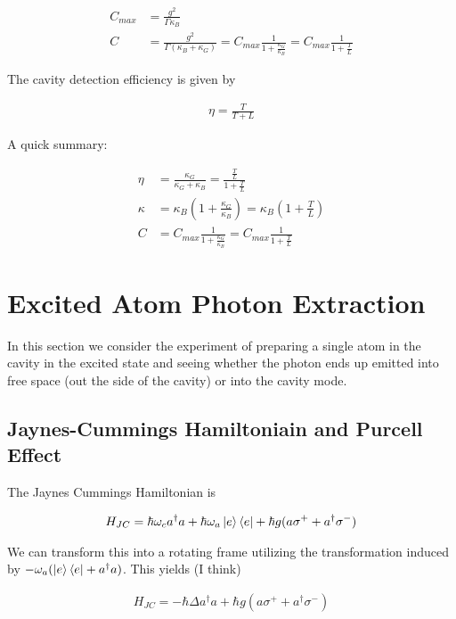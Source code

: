 \documentclass[12pt]{article}
\begin{document}
\begin{align}
C_{max} &= \frac{g^2}{\Gamma \kappa_B}\\
C &= \frac{g^2}{\Gamma(\kappa_B+\kappa_G)} = C_{max} \frac{1}{1+\frac{\kappa_G}{\kappa_B}} = C_{max} \frac{1}{1+\frac{T}{L}}
\end{align}

The cavity detection efficiency is given by

\begin{align}
\eta = \frac{T}{T+L}	
\end{align}

A quick summary:

\begin{align}
\eta &= \frac{\kappa_G}{\kappa_G+\kappa_B} = \frac{\frac{T}{L}}{1+\frac{T}{L}}\\
\kappa &= \kappa_B\left(1+\frac{\kappa_G}{\kappa_B}\right) = \kappa_B\left(1+\frac{T}{L}\right)\\
C &= C_{max}\frac{1}{1+\frac{\kappa_G}{\kappa_B}} = C_{max}\frac{1}{1+\frac{T}{L}}
\end{align}


\section{Excited Atom Photon Extraction}

In this section we consider the experiment of preparing a single atom in the cavity in the excited state and seeing whether the photon ends up emitted into free space (out the side of the cavity) or into the cavity mode.

\subsection{Jaynes-Cummings Hamiltoniain and Purcell Effect}

The Jaynes Cummings Hamiltonian is

\begin{align}
H_{JC} = \hbar \omega_c a^{\dag} a + \hbar \omega_a \ket{e}\bra{e} + \hbar g (a\sigma^+ + a^{\dag}\sigma^-)
\end{align}

We can transform this into a rotating frame utilizing the transformation induced by $-\omega_a(\ket{e}\bra{e}+a^{\dag}a)$. This yields (I think)

\begin{align}
H_{JC} = -\hbar \Delta a^{\dag} a + \hbar g (a\sigma^+ + a^{\dag}\sigma^-)
\end{align}
\end{document}
